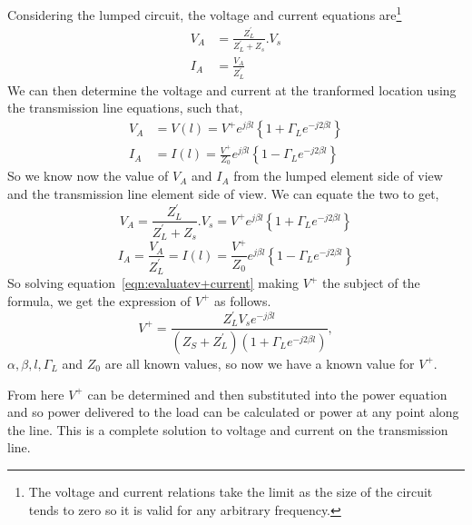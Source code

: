 Considering the lumped circuit, the voltage and current equations are\footnote{
The voltage and current relations take the limit as the size of the circuit tends to zero so it is valid for any arbitrary frequency.
}
\begin{align}
V_A &= \frac{Z^'_L}{Z^{'}_L + Z_s} . V_s\label{eqn:transimpvoltage}\\
I_A &= \frac{V_A}{Z^{'}_L}\label{eqn:transimpcurrent}
\end{align} 
We can then determine the voltage and current at the tranformed location using the transmission line equations, such that,
\begin{align*} 
V_A &= V(l) = V^+ e^{j\beta l} \left\lbrace 1 + \Gamma_L e^{-j2\beta l} \right\rbrace\\
I_A &= I(l) = \frac{V^+}{Z_0} e^{j\beta l} \left\lbrace 1 - \Gamma_L e^{-j2\beta l} \right\rbrace
\end{align*}
So we know now the value of $V_A$ and $I_A$ from the lumped element side of view and the transmission line element side of view. We can equate the two to get,
\begin{equation} 
V_A = \frac{Z^{'}_L}{Z^{'}_L + Z_s} . V_s = V^+ e^{j\beta l} \left\lbrace 1 + \Gamma_L e^{-j2\beta l} \right\rbrace\label{eqn:evaluatev+voltage}
\end{equation}
\begin{equation}
I_A = \frac{V_A}{Z^{'}_L} = I(l) = \frac{V^+}{Z_0} e^{j\beta l} \left\lbrace 1 - \Gamma_L e^{-j2\beta l} \right\rbrace
\label{eqn:evaluatev+current}
\end{equation}
So solving equation~\ref{eqn:evaluatev+current} making $V^{+}$ the subject of the formula, we get the expression of $V^+$ as follows. 
\begin{equation} 
V^+ = \frac{Z^{'}_L V_s e^{-j\beta l}}{(Z_S + Z^{'}_L)(1 + \Gamma_L e^{-j2\beta l })}, 
\end{equation}
$\alpha, \beta, l, \Gamma_L$ and $Z_0$ are all known values, so now we have a known value for $V^+$.

From here $V^+$ can be determined and then substituted into the power equation and so power delivered to the load can be calculated or power at any point along the line. This is a complete solution to voltage and current on the transmission line.

